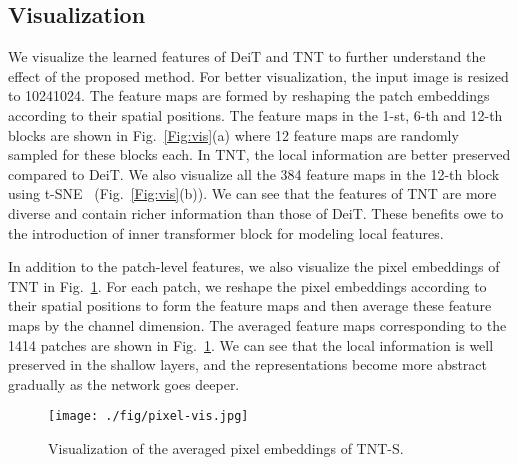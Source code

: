 \documentclass{article}
\begin{document}
\begin{figure*}[htp]
	\vspace{-0.5em}
	\centering
	\caption{Visualization of the features of DeiT-S and TNT-S.}
	\label{Fig:vis}
	\vspace{-1.0em}
\end{figure*}

\subsection{Visualization}
We visualize the learned features of DeiT and TNT to further understand the effect of the proposed method. For better visualization, the input image is resized to 10241024. The feature maps are formed by reshaping the patch embeddings according to their spatial positions. The feature maps in the 1-st, 6-th and 12-th blocks are shown in Fig.~\ref{Fig:vis}(a) where 12 feature maps are randomly sampled for these blocks each. In TNT, the local information are better preserved compared to DeiT. We also visualize all the 384 feature maps in the 12-th block using t-SNE~\cite{tsne} (Fig.~\ref{Fig:vis}(b)). We can see that the features of TNT are more diverse and contain richer information than those of DeiT. These benefits owe to the introduction of inner transformer block for modeling local features.



In addition to the patch-level features, we also visualize the pixel embeddings of TNT in Fig.~\ref{Fig:pixel-vis}. For each patch, we reshape the pixel embeddings according to their spatial positions to form the feature maps and then average these feature maps by the channel dimension. The averaged feature maps corresponding to the 1414 patches are shown in Fig.~\ref{Fig:pixel-vis}. We can see that the local information is well preserved in the shallow layers, and the representations become more abstract gradually as the network goes deeper.

\begin{figure}[htp]
	\vspace{-0.5em}
	\centering
	\texttt{[image: ./fig/pixel-vis.jpg]}
	\vspace{-0.5em}
	\caption{Visualization of the averaged pixel embeddings of TNT-S.}
	\label{Fig:pixel-vis}
	\vspace{-1.0em}
\end{figure}
\end{document}
